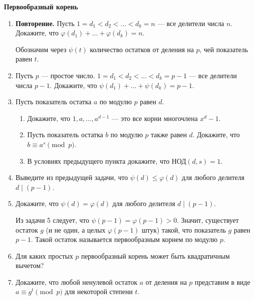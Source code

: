 \documentclass{article}
\begin{document}
\large
	
\begin{center}
	\textbf{Первообразный корень}
\end{center}

\begin{enumerate}[label*=\protect\fbox{\arabic{enumi}}]
	
	\item \textbf{Повторение.} Пусть $1 = d_1 < d_2 < \ldots < d_k = n$ — все делители числа $n$. Докажите, что $\varphi(d_1) + \ldots + \varphi(d_k) = n$.
	
	Обозначим через $\psi(t)$ количество остатков от деления на $p$, чей показатель равен $t$.
	
	\item Пусть $p$ — простое число. $1 = d_1 < d_2 < \ldots < d_k = p - 1$ — все делители числа $p - 1$. Докажите, что $\psi(d_1) + \ldots + \psi(d_k) = p - 1$.
	
	\item Пусть показатель остатка $a$ по модулю $p$ равен $d$.
	
	\begin{enumerate}
		\item Докажите, что $1, a, \ldots, a^{d-1}$ — это все корни многочлена $x^d - 1$.
		\item Пусть показатель остатка $b$ по модулю $p$ также равен $d$. Докажите, что $b \equiv a^s \pmod{p}$.
		\item В условиях предыдущего пункта докажите, что $\text{НОД}(d, s) = 1$.
	\end{enumerate}
	
	\item Выведите из предыдущей задачи, что $\psi(d) \leq \varphi(d)$ для любого делителя $d \mid (p - 1)$.
	
	\item Докажите, что $\psi(d) = \varphi(d)$ для любого делителя $d \mid (p - 1)$.
	
	Из задачи 5 следует, что $\psi(p - 1) = \varphi(p - 1) > 0$. Значит, существует остаток $g$ (и не один, а целых $\varphi(p - 1)$ штук) такой, что показатель $g$ равен $p - 1$. Такой остаток называется первообразным корнем по модулю $p$.
	
	\item Для каких простых $p$ первообразный корень может быть квадратичным вычетом?
	
	\item Докажите, что любой ненулевой остаток $a$ от деления на $p$ представим в виде $a \equiv g^t \pmod{p}$ для некоторой степени $t$.
	

\end{enumerate}
\end{document}
